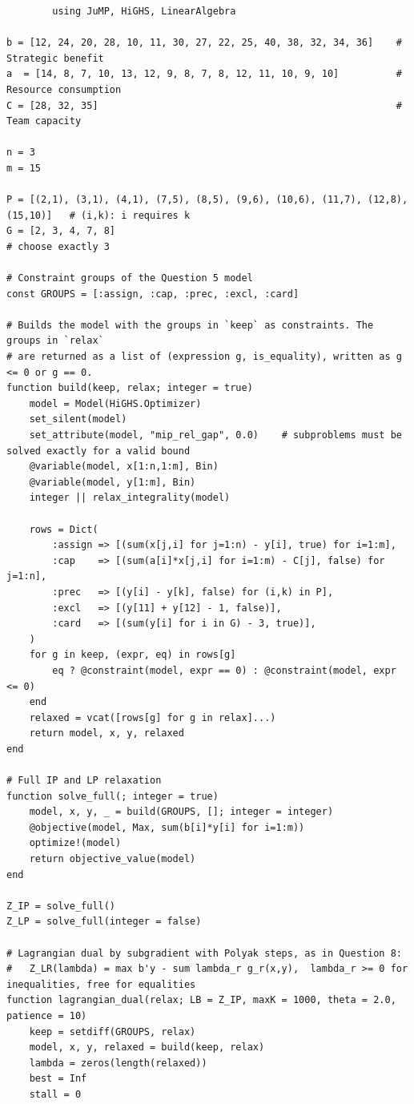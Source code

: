 \begin{appendicies}
    

    \begin{verbatim}
        using JuMP, HiGHS, LinearAlgebra

b = [12, 24, 20, 28, 10, 11, 30, 27, 22, 25, 40, 38, 32, 34, 36]    # Strategic benefit
a  = [14, 8, 7, 10, 13, 12, 9, 8, 7, 8, 12, 11, 10, 9, 10]          # Resource consumption
C = [28, 32, 35]                                                    # Team capacity

n = 3
m = 15

P = [(2,1), (3,1), (4,1), (7,5), (8,5), (9,6), (10,6), (11,7), (12,8), (15,10)]   # (i,k): i requires k
G = [2, 3, 4, 7, 8]                                                               # choose exactly 3

# Constraint groups of the Question 5 model
const GROUPS = [:assign, :cap, :prec, :excl, :card]

# Builds the model with the groups in `keep` as constraints. The groups in `relax`
# are returned as a list of (expression g, is_equality), written as g <= 0 or g == 0.
function build(keep, relax; integer = true)
    model = Model(HiGHS.Optimizer)
    set_silent(model)
    set_attribute(model, "mip_rel_gap", 0.0)    # subproblems must be solved exactly for a valid bound
    @variable(model, x[1:n,1:m], Bin)
    @variable(model, y[1:m], Bin)
    integer || relax_integrality(model)

    rows = Dict(
        :assign => [(sum(x[j,i] for j=1:n) - y[i], true) for i=1:m],
        :cap    => [(sum(a[i]*x[j,i] for i=1:m) - C[j], false) for j=1:n],
        :prec   => [(y[i] - y[k], false) for (i,k) in P],
        :excl   => [(y[11] + y[12] - 1, false)],
        :card   => [(sum(y[i] for i in G) - 3, true)],
    )
    for g in keep, (expr, eq) in rows[g]
        eq ? @constraint(model, expr == 0) : @constraint(model, expr <= 0)
    end
    relaxed = vcat([rows[g] for g in relax]...)
    return model, x, y, relaxed
end

# Full IP and LP relaxation
function solve_full(; integer = true)
    model, x, y, _ = build(GROUPS, []; integer = integer)
    @objective(model, Max, sum(b[i]*y[i] for i=1:m))
    optimize!(model)
    return objective_value(model)
end

Z_IP = solve_full()
Z_LP = solve_full(integer = false)

# Lagrangian dual by subgradient with Polyak steps, as in Question 8:
#   Z_LR(lambda) = max b'y - sum lambda_r g_r(x,y),  lambda_r >= 0 for inequalities, free for equalities
function lagrangian_dual(relax; LB = Z_IP, maxK = 1000, theta = 2.0, patience = 10)
    keep = setdiff(GROUPS, relax)
    model, x, y, relaxed = build(keep, relax)
    lambda = zeros(length(relaxed))
    best = Inf
    stall = 0


\end{verbatim}
\end{appendicies}
